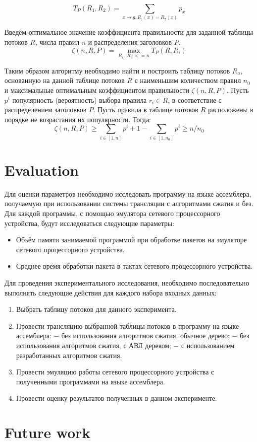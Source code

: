 \documentclass[conference]{IEEEtran}
\begin{document}
            \[T_P(R_1, R_2) = \sum_{x \rightarrow g, R_1(x) = R_2(x)} p_x\]

            Введём оптимальное значение коэффициента правильности для заданной таблицы потоков \(R\), числа правил \(n\) и распределения заголовков \(P\).
            \[\zeta(n, R, P) = \max_{R_i, |R_i| <= n} T_P(R, R_i)\]
            
            Таким образом алгоритму необходимо найти и построить таблицу потоков \(R_a\), основанную на данной таблице потоков \(R\)
            с наименьшим количеством правил \(n_0\) и максимальные оптимальным коэффициентом правильности \(\zeta(n, R, P)\).
            Пусть \(p^i\) популярность (вероятность) выбора правила \(r_i \in R\), в соответствие с распределением заголовков \(P\). Пусть
            правила в таблице потоков \(R\) расположены в порядке не возрастания их популярности. Тогда:
            \[\zeta(n, R, P) \geq \sum_{i \in [1, n]} p^i + 1 - \sum_{i \in [1, n_0]} p^i \geq n/n_0\]


    \section{Evaluation}
            Для оценки параметров необходимо исследовать программу на языке ассемблера, получаемую при использовании
            системы трансляции с алгоритмами сжатия и без. Для каждой программы, с помощью эмулятора сетевого процессорного устройства,
            будут исследоваться следующие параметры:
            \begin{itemize}
                \item Объём памяти занимаемой программой при обработке пакетов на эмуляторе сетевого процессорного устройства.
                \item Среднее время обработки пакета в тактах сетевого процессорного устройства.
            \end{itemize}
            
            Для проведения экспериментального исследования, необходимо последовательно выполнять следующие действия для каждого набора входных данных:
            \begin{enumerate}
                \item Выбрать таблицу потоков для данного эксперимента.
                \item Провести трансляцию выбранной таблицы потоков в программу на языке ассемблера:
                    \subitem $-$ без использования алгоритмов сжатия, обычное дерево;
                    \subitem $-$ без использования алгоритмов сжатия, с АВЛ деревом;
                    \subitem $-$ с использованием разработанных алгоритмов сжатия.
                \item Провести эмуляцию работы сетевого процессорного устройства с полученными программами на языке ассемблера.
                \item Провести оценку результатов полученных в данном эксперименте.
            \end{enumerate}

    \section{Future work}
 \printbibliography{}
\end{document}
